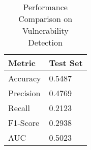 \begin{table}[h]
\centering
\caption{Performance Comparison on Vulnerability Detection}
\label{tab:results}
\begin{tabular}{ll}
\toprule
Metric & Test Set \\
\midrule
Accuracy & 0.5487 \\
Precision & 0.4769 \\
Recall & 0.2123 \\
F1-Score & 0.2938 \\
AUC & 0.5023 \\
\bottomrule
\end{tabular}
\end{table}
